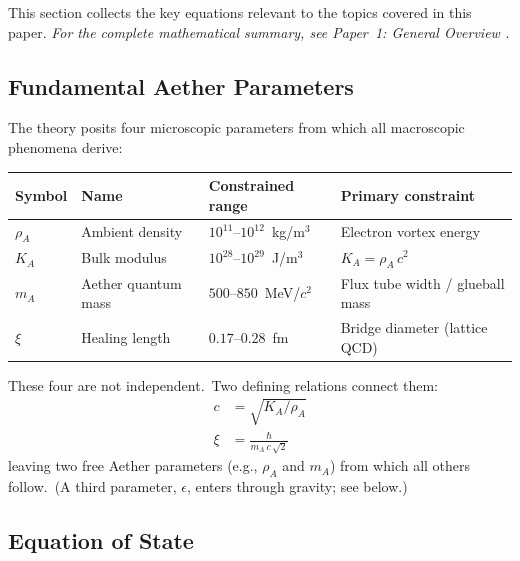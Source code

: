 ﻿\documentclass[12pt,letterpaper]{article}
\newcommand{\rhoa}{\rho_{\!A}}
\newcommand{\Ka}{K_{\!A}}
\begin{document}
This section collects the key equations relevant to the topics covered in this paper.
\noindent\textit{For the complete mathematical summary, see Paper~1: General Overview \cite{otto-overview}.}

\subsection{Fundamental Aether Parameters}

The theory posits four microscopic parameters from which all macroscopic
phenomena derive:
%
\begin{center}
\begin{tabular}{@{}llll@{}}
\hline
\textbf{Symbol} & \textbf{Name} & \textbf{Constrained range} & \textbf{Primary constraint} \\
\hline
$\rhoa$  & Ambient density     & $10^{11}$--$10^{12}$~kg/m$^3$         & Electron vortex energy \\
$\Ka$    & Bulk modulus         & $10^{28}$--$10^{29}$~J/m$^3$          & $\Ka = \rhoa\,c^2$ \\
$m_A$    & Aether quantum mass  & $500$--$850$~MeV/$c^2$                & Flux tube width / glueball mass \\
$\xi$    & Healing length       & $0.17$--$0.28$~fm                     & Bridge diameter (lattice QCD) \\
\hline
\end{tabular}
\end{center}

These four are not independent.\ Two defining relations connect them:
%
\begin{align}
  c &= \sqrt{\Ka / \rhoa}
    \label{eq:sum-speed-of-light} \\
  \xi &= \frac{\hbar}{m_A\,c\,\sqrt{2}}
    \label{eq:sum-healing-length}
\end{align}
%
leaving two free Aether parameters (e.g., $\rhoa$ and $m_A$) from which all
others follow.\ (A third parameter, $\epsilon$, enters through gravity; see below.)


\subsection{Equation of State}
\end{document}
